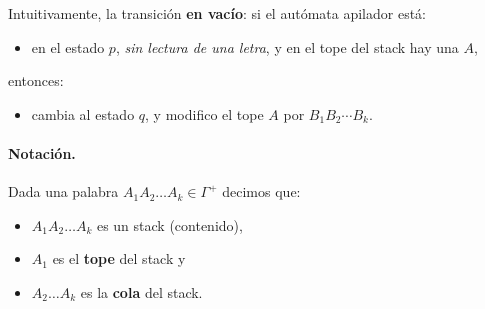 Intuitivamente, la transición \textbf{en vacío}:
si el autómata apilador está:
\begin{itemize}
    \item en el estado $p$, \textit{sin lectura de una letra}, y en el tope del stack hay una $A$,
\end{itemize}
entonces:
\begin{itemize}
    \item cambia al estado $q$, y modifico el tope $A$ por $B_1B_2\cdots B_k$.
\end{itemize}


\paragraph*{Notación.} Dada una palabra $A_1A_2\ldots A_k \in \Gamma^+$ decimos que:
\begin{itemize}
    \item $A_1 A_2 \ldots A_k$ es un stack (contenido),
    \item $A_1$ es el \textbf{tope} del stack y
    \item $A_2 \ldots A_k$ es la \textbf{cola} del stack.
\end{itemize}

